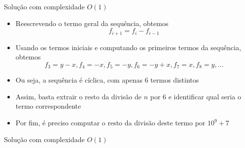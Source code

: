 \begin{frame}[fragile]{Solução com complexidade $O(1)$}

    \begin{itemize}
        \item Reescrevendo o termo geral da sequência, obtemos
        $$
            f_{i + 1} = f_i - f_{i - 1}
        $$

        \item Usando os termos iniciais e computando os primeiros termos da sequência, obtemos
        $$
            f_3 = y - x, f_4 = -x, f_5 = -y, f_6 = -y + x, f_7 = x, f_8 = y, \ldots
        $$

        \item Ou seja, a sequência é cíclica, com apenas 6 termos distintos

        \item Assim, basta extrair o resto da divisão de $n$ por 6 e identificar qual seria o 
            termo correspondente

        \item Por fim, é preciso computar o resto da divisão deste termo por $10^9 + 7$
    \end{itemize}

\end{frame}

\begin{frame}[fragile]{Solução com complexidade $O(1)$}
\end{frame}
